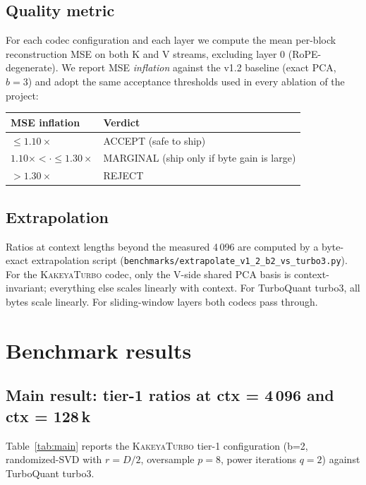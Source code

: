 \documentclass[11pt,a4paper]{article}
\theoremstyle{definition}
\theoremstyle{plain}
\begin{document}
\subsection{Quality metric}
For each codec configuration and each layer we compute the mean per-block reconstruction MSE on both K and V streams, excluding layer 0 (RoPE-degenerate). We report MSE \emph{inflation} against the v1.2 baseline (exact PCA, $b=3$) and adopt the same acceptance thresholds used in every ablation of the project:
\begin{center}
\begin{tabular}{ll}
  \toprule
  MSE inflation & Verdict \\
  \midrule
  $\leq 1.10 \times$ & ACCEPT (safe to ship) \\
  $1.10\times < \cdot \leq 1.30\times$ & MARGINAL (ship only if byte gain is large) \\
  $> 1.30 \times$ & REJECT \\
  \bottomrule
\end{tabular}
\end{center}

\subsection{Extrapolation}
Ratios at context lengths beyond the measured 4\,096 are computed by a byte-exact extrapolation script (\verb|benchmarks/extrapolate_v1_2_b2_vs_turbo3.py|). For the \textsc{KakeyaTurbo} codec, only the V-side shared PCA basis is context-invariant; everything else scales linearly with context. For TurboQuant turbo3, all bytes scale linearly. For sliding-window layers both codecs pass through.

\section{Benchmark results}
\label{sec:benchmark}

\subsection{Main result: tier-1 ratios at ctx = 4\,096 and ctx = 128\,k}

Table~\ref{tab:main} reports the \textsc{KakeyaTurbo} tier-1 configuration (b=2, randomized-SVD with $r=D/2$, oversample $p=8$, power iterations $q=2$) against TurboQuant turbo3.
\end{document}
